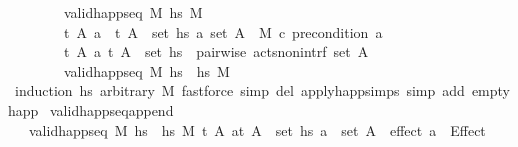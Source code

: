 \begin{isabellebody}
\ \ \ \ \ \ \ \ valid{\isacharunderscore}{\kern0pt}happ{\isacharunderscore}{\kern0pt}seq\ M\ hs{}\ M{\isacharprime}{\kern0pt}{\isacharsemicolon}{\kern0pt}\isanewline
\ \ \ \ \ \ \ \ {\isacharparenleft}{\kern0pt}{\isasymAnd}t\ A\ a{\isachardot}{\kern0pt}\ {\isasymlbrakk}\ {\isacharparenleft}{\kern0pt}t{\isacharcomma}{\kern0pt}\ A{\isacharparenright}{\kern0pt}\ {\isasymin}\ set\ hs{}{\isacharsemicolon}{\kern0pt}\ a{\isasymin}\ set\ A{\isasymrbrakk}\ {\isasymLongrightarrow}\ M\ \isactrlsup c{\isasymTTurnstile}\isactrlsub {\isacharequal}{\kern0pt}\ precondition\ a{\isacharparenright}{\kern0pt}{\isacharsemicolon}{\kern0pt}\isanewline
\ \ \ \ \ \ \ \ {\isacharparenleft}{\kern0pt}{\isasymAnd}t\ A\ a{\isachardot}{\kern0pt}\ {\isacharparenleft}{\kern0pt}t{\isacharcomma}{\kern0pt}\ A{\isacharparenright}{\kern0pt}\ {\isasymin}\ set\ hs{}\ {\isasymLongrightarrow}\ pairwise\ acts{\isacharunderscore}{\kern0pt}non{\isacharunderscore}{\kern0pt}intrf\ {\isacharparenleft}{\kern0pt}set\ A{\isacharparenright}{\kern0pt}{\isacharparenright}{\kern0pt}\ {\isasymrbrakk}\ {\isasymLongrightarrow}\isanewline
\ \ \ \ \ \ \ \ valid{\isacharunderscore}{\kern0pt}happ{\isacharunderscore}{\kern0pt}seq\ M\ {\isacharparenleft}{\kern0pt}hs{}\ {\isacharat}{\kern0pt}\ hs{}{\isacharparenright}{\kern0pt}\ M{\isacharprime}{\kern0pt}{\isachardoublequoteclose}\isanewline
%
\isadelimproof
\ \ %
\endisadelimproof
%
\isatagproof
{}\isamarkupfalse%
\ {\isacharparenleft}{\kern0pt}induction\ hs{}\ arbitrary{\isacharcolon}{\kern0pt}\ M{\isacharparenright}{\kern0pt}\ {\isacharparenleft}{\kern0pt}fastforce\ simp\ del{\isacharcolon}{\kern0pt}\ apply{\isacharunderscore}{\kern0pt}happ{\isachardot}{\kern0pt}simps\ simp\ add{\isacharcolon}{\kern0pt}\ empty{\isacharunderscore}{\kern0pt}happ{\isacharparenright}{\kern0pt}{\isacharplus}{\kern0pt}%
\endisatagproof
{\isafoldproof}%
%
\isadelimproof
\isanewline
%
\endisadelimproof
\isanewline
{}\isamarkupfalse%
\ valid{\isacharunderscore}{\kern0pt}happ{\isacharunderscore}{\kern0pt}seq{\isacharunderscore}{\kern0pt}append{\isacharunderscore}{\kern0pt}{}{\isacharcolon}{\kern0pt}\isanewline
\ \ {\isachardoublequoteopen}{\isasymlbrakk}\ valid{\isacharunderscore}{\kern0pt}happ{\isacharunderscore}{\kern0pt}seq\ M\ {\isacharparenleft}{\kern0pt}hs{}\ {\isacharat}{\kern0pt}\ hs{}{\isacharparenright}{\kern0pt}\ M{\isacharprime}{\kern0pt}{\isacharsemicolon}{\kern0pt}\ {\isasymAnd}t\ A\ a{\isachardot}{\kern0pt}{\isasymlbrakk}{\isacharparenleft}{\kern0pt}t{\isacharcomma}{\kern0pt}\ A{\isacharparenright}{\kern0pt}\ {\isasymin}\ set\ hs{}{\isacharsemicolon}{\kern0pt}\ a\ {\isasymin}\ set\ A{\isasymrbrakk}\ {\isasymLongrightarrow}\ effect\ a\ {\isacharequal}{\kern0pt}\ Effect\ {\isacharbrackleft}{\kern0pt}{\isacharbrackright}{\kern0pt}\ {\isacharbrackleft}{\kern0pt}{\isacharbrackright}{\kern0pt}{\isasymrbrakk}\ {\isasymLongrightarrow}\isanewline

\end{isabellebody}
